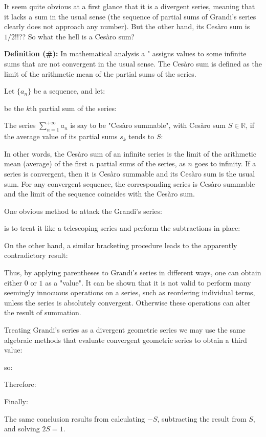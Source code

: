 	It seem quite obvious at a first glance that it is a divergent series, meaning that it lacks a sum in the usual sense (the sequence of partial sums of Grandi's series clearly does not approach any number). But the other hand, its Cesàro sum is $1/2$!!?? So what the hell is a Cesàro sum?
	
	\textbf{Definition (\#\mydef):} In mathematical analysis a " assigns values to some infinite sums that are not convergent in the usual sense. The Cesàro sum is defined as the limit of the arithmetic mean of the partial sums of the series.
	
	Let $\{a_n\}$ be a sequence, and let:
	
	be the $k$th partial sum of the series:
	
	The series $\sum _{n=1}^{+\infty}a_{n}$ is say to be "Cesàro summable", with Cesàro sum $S\in\mathbb{R}$, if the average value of its partial sums $s_k$ tends to $S$:
	
	In other words, the Cesàro sum of an infinite series is the limit of the arithmetic mean (average) of the first $n$ partial sums of the series, as $n$ goes to infinity. If a series is convergent, then it is Cesàro summable and its Cesàro sum is the usual sum. For any convergent sequence, the corresponding series is Cesàro summable and the limit of the sequence coincides with the Cesàro sum.
	
	One obvious method to attack the Grandi's series:
	
	is to treat it like a telescoping series and perform the subtractions in place:
	
	On the other hand, a similar bracketing procedure leads to the apparently contradictory result:
	
	Thus, by applying parentheses to Grandi's series in different ways, one can obtain either $0$ or $1$ as a "value". It can be shown that it is not valid to perform many seemingly innocuous operations on a series, such as reordering individual terms, unless the series is absolutely convergent. Otherwise these operations can alter the result of summation.

	Treating Grandi's series as a divergent geometric series we may use the same algebraic methods that evaluate convergent geometric series to obtain a third value:
	
	so:
	
	Therefore:
	
	Finally:
	
	The same conclusion results from calculating $-S$, subtracting the result from $S$, and solving $2S = 1$.

